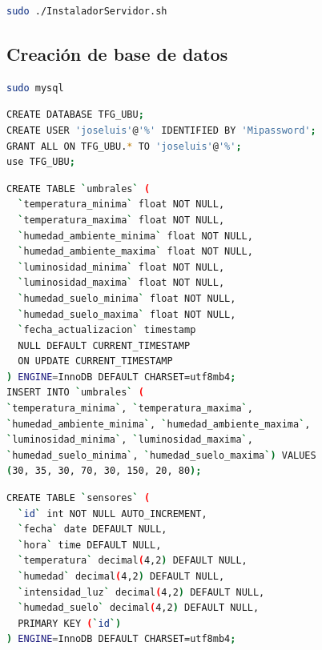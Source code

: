 \begin{lstlisting}[language=sh, firstnumber=0, basicstyle=\normalsize, caption={Ejecutamos \textbf{InstaladorServidor.sh}.}] 
sudo ./InstaladorServidor.sh
\end{lstlisting}

\subsection{Creación de base de datos}
\begin{lstlisting}[language=sh, firstnumber=0, basicstyle=\normalsize, caption={Comando para acceder a Mysql.}] 
sudo mysql\end{lstlisting}

\begin{lstlisting}[language=sh, firstnumber=0, basicstyle=\normalsize, caption={Comandos Mysql para crear Database \textbf{TFG\_UBU}.}] 
CREATE DATABASE TFG_UBU;
CREATE USER 'joseluis'@'%' IDENTIFIED BY 'Mipassword';
GRANT ALL ON TFG_UBU.* TO 'joseluis'@'%';
use TFG_UBU;
\end{lstlisting}


\begin{lstlisting}[language=sh, firstnumber=0, basicstyle=\normalsize, caption={Comandos Mysql para crear tabla \textbf{umbrales}.}] 
CREATE TABLE `umbrales` (
  `temperatura_minima` float NOT NULL,
  `temperatura_maxima` float NOT NULL,
  `humedad_ambiente_minima` float NOT NULL,
  `humedad_ambiente_maxima` float NOT NULL,
  `luminosidad_minima` float NOT NULL,
  `luminosidad_maxima` float NOT NULL,
  `humedad_suelo_minima` float NOT NULL,
  `humedad_suelo_maxima` float NOT NULL,
  `fecha_actualizacion` timestamp 
  NULL DEFAULT CURRENT_TIMESTAMP 
  ON UPDATE CURRENT_TIMESTAMP
) ENGINE=InnoDB DEFAULT CHARSET=utf8mb4;
INSERT INTO `umbrales` (
`temperatura_minima`, `temperatura_maxima`, 
`humedad_ambiente_minima`, `humedad_ambiente_maxima`, 
`luminosidad_minima`, `luminosidad_maxima`, 
`humedad_suelo_minima`, `humedad_suelo_maxima`) VALUES
(30, 35, 30, 70, 30, 150, 20, 80);
\end{lstlisting}

\begin{lstlisting}[language=sh, firstnumber=0, basicstyle=\normalsize, caption={Comandos Mysql para crear tabla \textbf{sensores}.}] 
CREATE TABLE `sensores` (
  `id` int NOT NULL AUTO_INCREMENT,
  `fecha` date DEFAULT NULL,
  `hora` time DEFAULT NULL,
  `temperatura` decimal(4,2) DEFAULT NULL,
  `humedad` decimal(4,2) DEFAULT NULL,
  `intensidad_luz` decimal(4,2) DEFAULT NULL,
  `humedad_suelo` decimal(4,2) DEFAULT NULL,
  PRIMARY KEY (`id`)
) ENGINE=InnoDB DEFAULT CHARSET=utf8mb4;
\end{lstlisting}


